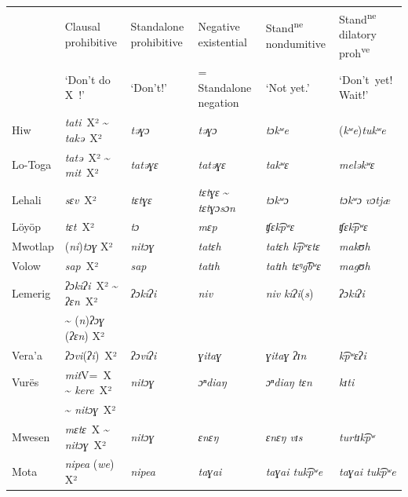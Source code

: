\documentclass[output=paper,colorlinks,citecolor=brown,draft]{langscibook}
\begin{document}
\begin{table}\footnotesize
\begin{tabularx}{\textwidth}{lXXXXX}
\lsptoprule
 & {Clausal prohibitive} & Standalone prohibitive & {Negative existential} & Stand\textsuperscript{ne} nondumitive & Stand\textsuperscript{ne} dilatory proh\textsuperscript{ve} \\
 & ‘Don't do X~!’ & ‘Don't!’ & = Standalone negation & ‘Not yet.’ & ‘Don’t~yet! Wait!’\\
\midrule
{Hiw} &  \textit{tati}~X² {\textasciitilde} \textit{takə}~X² & \textit{təɣɔ} & \textit{təɣɔ} & \textit{tɔkʷe} & (\textit{kʷe})\textit{tukʷe} \\
{Lo-Toga} &  \textit{tatə}~X² {\textasciitilde} \textit{mit}~X² & \textit{tatəɣɛ} & \textit{tatəɣɛ} & \textit{takʷɛ} & \textit{meləkʷɛ} \\
{Lehali} & \textit{sɛv}~X² & \textit{tɛtɣɛ} & \textit{tɛtɣɛ} {\textasciitilde} \textit{tɛtɣɔsɔn} & \textit{tɔkʷɔ} & \textit{tɔkʷɔ} \textit{vɔtjæ}\\
{Löyöp} &  \textit{tɛt}~X² & \textit{tɔ} & \textit{mɛp} & \textit{ʧɛk​͡pʷɛ} & \textit{ʧɛk​͡pʷɛ}\\
{Mwotlap} &  (\textit{ni})\textit{tɔɣ} X² & \textit{nitɔɣ} & \textit{tatɛh} & \textit{tatɛh k​͡pʷɛtɛ} & \textit{makʊh}\\
{Volow} & \textit{sap}~X² & \textit{sap} & \textit{tatɪh} & \textit{tatɪh tɛᵑg​͡bʷɛ} & \textit{magʊh}\\
{Lemerig} &  \textit{ʔɔkiʔi}~X² {\textasciitilde} \textit{ʔɛn}~X² & \textit{ʔɔkiʔi} & \textit{niv} & \textit{niv} \textit{kiʔi}(\textit{s}) & \textit{ʔɔkiʔi} \\
& {\textasciitilde} (\textit{n})\textit{ʔɔɣ} (\textit{ʔɛn}) X² &&&& \\
{Vera'a} &  \textit{ʔɔvi}(\textit{ʔi})~X² & \textit{ʔɔviʔi} & \textit{ɣitaɣ} & \textit{ɣitaɣ ʔɪn} & \textit{k​͡pʷɛʔi}\\
{Vurës} &  \textit{mit}V=~X {\textasciitilde} \textit{kere}~X² & \textit{nitɔɣ} & \textit{ɔⁿdiaŋ} & \textit{ɔⁿdiaŋ tɛn} & \textit{kɪti} \\
& {\textasciitilde} \textit{nitɔɣ}~X² &&&&\\
{Mwesen} &  \textit{mɛtɛ}~X {\textasciitilde} \textit{nitɔɣ}~X² & \textit{nitɔɣ} & \textit{ɛnɛŋ} & \textit{ɛnɛŋ vɪs} & \textit{turtɪk​͡pʷ} \\
{Mota} &  \textit{nipea} (\textit{we}) X² & \textit{nipea} & \textit{taɣai} & \textit{taɣai tuk​͡pʷe} & \textit{taɣai tuk​͡pʷe}\\

\end{tabularx}
\end{table}
\end{document}
